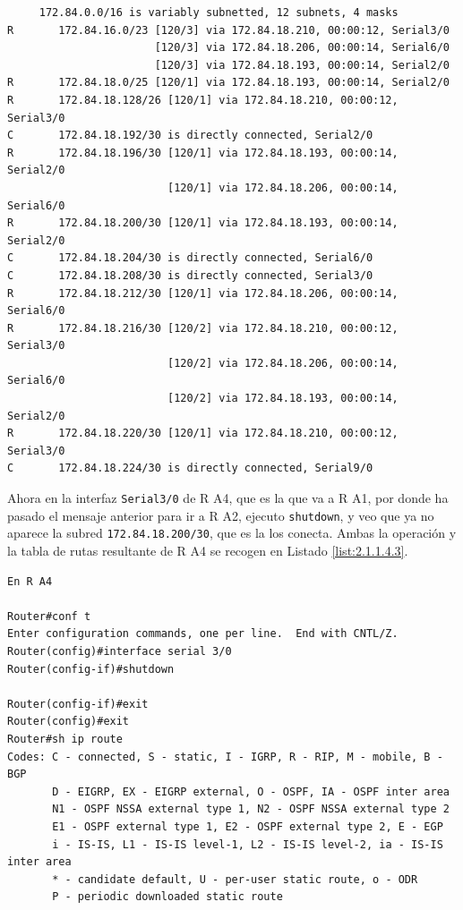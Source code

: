 \documentclass[twoside, 11pt]{article}
\begin{document}
\begin{enumerate}
\begin{center}
\begin{verbatim}
     172.84.0.0/16 is variably subnetted, 12 subnets, 4 masks
R       172.84.16.0/23 [120/3] via 172.84.18.210, 00:00:12, Serial3/0
                       [120/3] via 172.84.18.206, 00:00:14, Serial6/0
                       [120/3] via 172.84.18.193, 00:00:14, Serial2/0
R       172.84.18.0/25 [120/1] via 172.84.18.193, 00:00:14, Serial2/0
R       172.84.18.128/26 [120/1] via 172.84.18.210, 00:00:12, Serial3/0
C       172.84.18.192/30 is directly connected, Serial2/0
R       172.84.18.196/30 [120/1] via 172.84.18.193, 00:00:14, Serial2/0
                         [120/1] via 172.84.18.206, 00:00:14, Serial6/0
R       172.84.18.200/30 [120/1] via 172.84.18.193, 00:00:14, Serial2/0
C       172.84.18.204/30 is directly connected, Serial6/0
C       172.84.18.208/30 is directly connected, Serial3/0
R       172.84.18.212/30 [120/1] via 172.84.18.206, 00:00:14, Serial6/0
R       172.84.18.216/30 [120/2] via 172.84.18.210, 00:00:12, Serial3/0
                         [120/2] via 172.84.18.206, 00:00:14, Serial6/0
                         [120/2] via 172.84.18.193, 00:00:14, Serial2/0
R       172.84.18.220/30 [120/1] via 172.84.18.210, 00:00:12, Serial3/0
C       172.84.18.224/30 is directly connected, Serial9/0
\end{verbatim}
\label{list:2.1.1.4.2}
\end{center}

Ahora en la interfaz \texttt{Serial3/0} de R A4, que es la que va a R A1, por donde ha pasado el mensaje anterior para ir a R A2, ejecuto \texttt{shutdown}, y veo que ya no aparece la subred \texttt{172.84.18.200/30}, que es la los conecta. Ambas la operación y la tabla de rutas resultante de R A4 se recogen en Listado \ref{list:2.1.1.4.3}.

\begin{center}
\begin{verbatim}
En R A4

Router#conf t
Enter configuration commands, one per line.  End with CNTL/Z.
Router(config)#interface serial 3/0
Router(config-if)#shutdown 

Router(config-if)#exit
Router(config)#exit
Router#sh ip route 
Codes: C - connected, S - static, I - IGRP, R - RIP, M - mobile, B - BGP
       D - EIGRP, EX - EIGRP external, O - OSPF, IA - OSPF inter area
       N1 - OSPF NSSA external type 1, N2 - OSPF NSSA external type 2
       E1 - OSPF external type 1, E2 - OSPF external type 2, E - EGP
       i - IS-IS, L1 - IS-IS level-1, L2 - IS-IS level-2, ia - IS-IS inter area
       * - candidate default, U - per-user static route, o - ODR
       P - periodic downloaded static route


\end{verbatim}
\end{center}
\end{enumerate}
\end{document}
